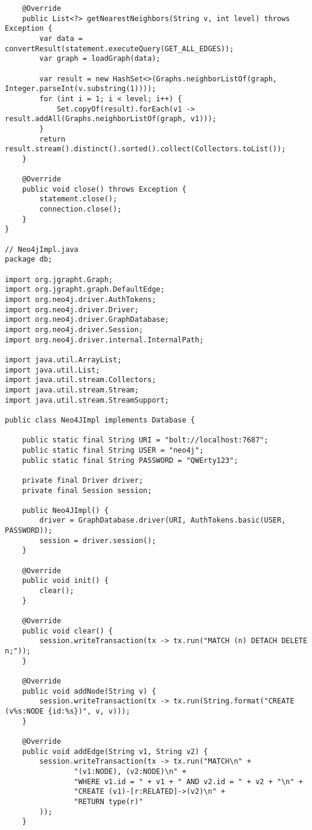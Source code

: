 \begin{lstlisting}
    @Override
    public List<?> getNearestNeighbors(String v, int level) throws Exception {
        var data = convertResult(statement.executeQuery(GET_ALL_EDGES));
        var graph = loadGraph(data);

        var result = new HashSet<>(Graphs.neighborListOf(graph, Integer.parseInt(v.substring(1))));
        for (int i = 1; i < level; i++) {
            Set.copyOf(result).forEach(v1 -> result.addAll(Graphs.neighborListOf(graph, v1)));
        }
        return result.stream().distinct().sorted().collect(Collectors.toList());
    }

    @Override
    public void close() throws Exception {
        statement.close();
        connection.close();
    }
}

// Neo4jImpl.java
package db;

import org.jgrapht.Graph;
import org.jgrapht.graph.DefaultEdge;
import org.neo4j.driver.AuthTokens;
import org.neo4j.driver.Driver;
import org.neo4j.driver.GraphDatabase;
import org.neo4j.driver.Session;
import org.neo4j.driver.internal.InternalPath;

import java.util.ArrayList;
import java.util.List;
import java.util.stream.Collectors;
import java.util.stream.Stream;
import java.util.stream.StreamSupport;

public class Neo4JImpl implements Database {

    public static final String URI = "bolt://localhost:7687";
    public static final String USER = "neo4j";
    public static final String PASSWORD = "QWErty123";

    private final Driver driver;
    private final Session session;

    public Neo4JImpl() {
        driver = GraphDatabase.driver(URI, AuthTokens.basic(USER, PASSWORD));
        session = driver.session();
    }

    @Override
    public void init() {
        clear();
    }

    @Override
    public void clear() {
        session.writeTransaction(tx -> tx.run("MATCH (n) DETACH DELETE n;"));
    }

    @Override
    public void addNode(String v) {
        session.writeTransaction(tx -> tx.run(String.format("CREATE (v%s:NODE {id:%s})", v, v)));
    }

    @Override
    public void addEdge(String v1, String v2) {
        session.writeTransaction(tx -> tx.run("MATCH\n" +
                "(v1:NODE), (v2:NODE)\n" +
                "WHERE v1.id = " + v1 + " AND v2.id = " + v2 + "\n" +
                "CREATE (v1)-[r:RELATED]->(v2)\n" +
                "RETURN type(r)"
        ));
    }


\end{lstlisting}
